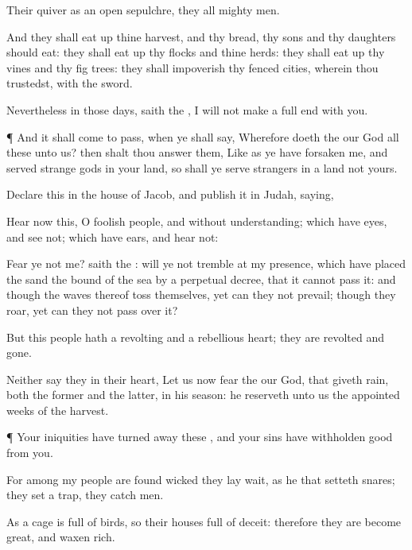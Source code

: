 {Their
quiver
{} as an
open
sepulchre, they
{} all mighty
men.

And they shall eat
up thine
harvest, and thy
bread,
{} thy
sons and thy
daughters should
eat: they shall eat
up thy
flocks and thine
herds: they shall eat
up thy
vines and thy fig
trees: they shall
impoverish thy
fenced
cities, wherein
thou
trustedst, with the
sword.

Nevertheless in those
days,
saith the
{}, I will not
make a full
end with you.


\par }{\PP {}¶ And it shall come to pass, when ye shall
say,
Wherefore
doeth the
{} our
God all these
{} unto us? then shalt thou
answer them, Like as ye have
forsaken me, and
served
strange
gods in your
land, so shall ye
serve
strangers in a
land
{} not yours.


\par }{\PP {}Declare this in the
house of
Jacob, and
publish it in
Judah,
saying,

Hear now this, O
foolish
people, and without
understanding; which have
eyes, and
see not; which have
ears, and
hear not:

Fear ye not me?
saith the
{}: will ye not
tremble at my
presence, which have
placed the
sand
{} the
bound of the
sea by a
perpetual
decree, that it cannot
pass it: and though the
waves thereof
toss themselves, yet can they not
prevail; though they
roar, yet can they not pass
over it?

But this
people hath a
revolting and a
rebellious
heart; they are
revolted and
gone.

Neither
say they in their
heart, Let us now
fear the
{} our
God, that
giveth
rain, both the
former and the
latter, in his
season: he
reserveth unto us the
appointed
weeks of the
harvest.


\par }{\PP {}¶ Your
iniquities have turned
away these
{}, and your
sins have
withholden
good
{} from you.

For among my
people are
found
wicked
{} they lay
wait, as he that
setteth
snares; they
set a
trap, they
catch
men.

As a
cage is
full of
birds, so
{} their
houses
full of
deceit: therefore they are become
great, and waxen
rich.

}
